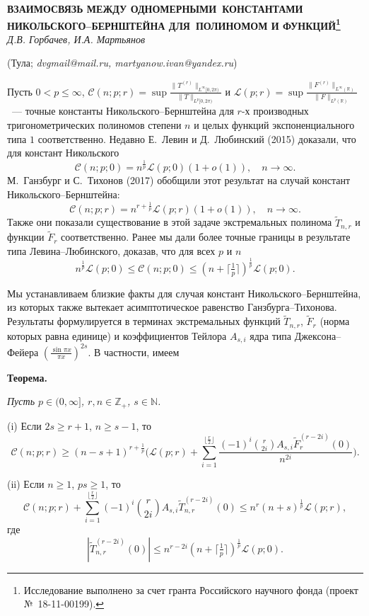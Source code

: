 
\begin{center}
    {\bf ВЗАИМОСВЯЗЬ МЕЖДУ ОДНОМЕРНЫМИ~КОНСТАНТАМИ НИКОЛЬСКОГО--БЕРНШТЕЙНА ДЛЯ~ПОЛИНОМОМ И ФУНКЦИЙ\footnote{Исследование выполнено за счет гранта Российского научного фонда (проект №~18-11-00199).}}\\

    {\it Д.В. Горбачев, И.А. Мартьянов}

    (Тула; {\it dvgmail@mail.ru, martyanow.ivan@yandex.ru})
\end{center}


Пусть $0<p\le \infty$, $\mathcal{C}(n;p;r)=\sup
\frac{\|T^{(r)}\|_{L^{\infty}[0,2\pi)}}{\|T\|_{L^{p}[0,2\pi)}}$ и
$\mathcal{L}(p;r)=\sup
\frac{\|F^{(r)}\|_{L^{\infty}(\mathbb{R})}}{\|F\|_{L^{p}(\mathbb{R})}}$~---
точные константы Никольского--Бернштейна для $r$-х производных
тригонометрических полиномов степени $n$ и целых функций экспоненциального типа
$1$ соответственно. Недавно Е.~Левин и Д.~Любинский (2015) доказали, что для
констант Никольского
\[
\mathcal{C}(n;p;0)=n^{\frac{1}{p}}\mathcal{L}(p;0)(1+o(1)),\quad n\to \infty.
\]
М.~Ганзбург и С.~Тихонов (2017) обобщили этот результат на случай констант
Никольского--Бернштейна:
\[
\mathcal{C}(n;p;r)=n^{r+\frac{1}{p}}\mathcal{L}(p;r)(1+o(1)),\quad n\to \infty.
\]
Также они показали существование в этой задаче экстремальных полинома
$\tilde{T}_{n,r}$ и функции $\tilde{F}_{r}$ соответственно. Ранее мы дали более
точные границы в результате типа Левина--Любинского, доказав, что для всех $p$
и $n$
\[
n^{\frac{1}{p}}\mathcal{L}(p;0)\le \mathcal{C}(n;p;0)\le (n+\lceil
\tfrac{1}{p}\rceil)^{\frac{1}{p}}\mathcal{L}(p;0).
\]

Мы устанавливаем близкие факты для случая констант Никольского--Бернштейна, из
которых также вытекает асимптотическое равенство Ганзбурга--Тихонова.
Результаты формулируется в терминах экстремальных функций $\tilde{T}_{n,r}$,
$\tilde{F}_{r}$ (норма которых равна единице) и коэффициентов Тейлора $A_{s,i}$
ядра типа Джексона--Фейера $(\frac{\sin \pi x}{\pi x})^{2s}$. В частности,
имеем

\textbf{Теорема.} {\it Пусть $p\in (0,\infty]$, $r,n\in \mathbb{Z}_{+}$, $s\in
\mathbb{N}$.

\textup{(i)} Если $2s\ge r+1$, $n\ge s-1$, то
\[
\mathcal{C}(n;p;r)\ge (n-s+1)^{r+\frac{1}{p}}\biggl(\mathcal{L}(p;r)+
\sum_{i=1}^{\lfloor
\frac{r}{2}\rfloor}\frac{(-1)^{i}\binom{r}{2i}A_{s,i}\tilde{F}_{r}^{(r-2i)}(0)}{n^{2i}}\biggr).
\]

\textup{(ii)} Если $n\ge 1$, $ps\ge 1$, то
\[
\mathcal{C}(n;p;r)+\sum_{i=1}^{\lfloor \frac{r}{2}\rfloor}(-1)^{i}\binom{r}{2i}A_{s,i}
\tilde{T}_{n,r}^{(r-2i)}(0)\le n^{r}(n+s)^{\frac{1}{p}}\mathcal{L}(p;r),
\]
где
\[
|\tilde{T}_{n,r}^{(r-2i)}(0)|\le n^{r-2i}(n+\lceil
\tfrac{1}{p}\rceil)^{\frac{1}{p}}\mathcal{L}(p;0).
\]
} 

